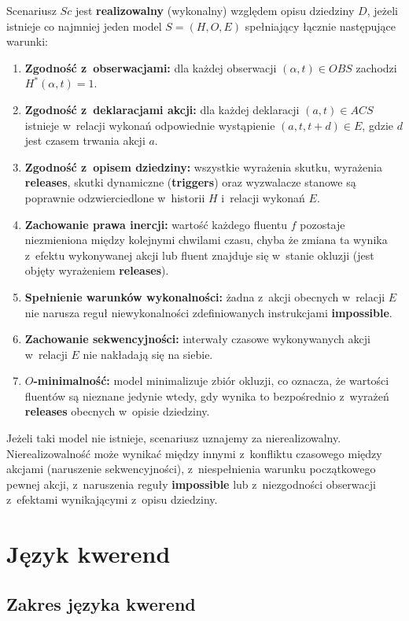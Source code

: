 \documentclass[12pt,a4paper]{article}
\begin{document}
Scenariusz $Sc$ jest \textbf{realizowalny} (wykonalny) względem opisu dziedziny $D$, jeżeli istnieje co najmniej jeden model $S = (H, O, E)$ spełniający łącznie następujące warunki:
\begin{enumerate}[label=\arabic*.]
    \item \textbf{Zgodność z~obserwacjami:} dla każdej obserwacji $(\alpha, t) \in OBS$ zachodzi $H^{*}(\alpha, t) = 1$.
    \item \textbf{Zgodność z~deklaracjami akcji:} dla każdej deklaracji $(a, t) \in ACS$ istnieje w~relacji wykonań odpowiednie wystąpienie $(a, t, t+d) \in E$, gdzie $d$ jest czasem trwania akcji $a$.
    \item \textbf{Zgodność z~opisem dziedziny:} wszystkie wyrażenia skutku, wyrażenia \textbf{releases}, skutki dynamiczne (\textbf{triggers}) oraz wyzwalacze stanowe są poprawnie odzwierciedlone w~historii $H$ i~relacji wykonań $E$.
    \item \textbf{Zachowanie prawa inercji:} wartość każdego fluentu $f$ pozostaje niezmieniona między kolejnymi chwilami czasu, chyba że zmiana ta wynika z~efektu wykonywanej akcji lub fluent znajduje się w~stanie okluzji (jest objęty wyrażeniem \textbf{releases}).
    \item \textbf{Spełnienie warunków wykonalności:} żadna z~akcji obecnych w~relacji $E$ nie narusza reguł niewykonalności zdefiniowanych instrukcjami \textbf{impossible}.
    \item \textbf{Zachowanie sekwencyjności:} interwały czasowe wykonywanych akcji w~relacji $E$ nie nakładają się na siebie.
    \item \textbf{$O$-minimalność:} model minimalizuje zbiór okluzji, co oznacza, że wartości fluentów są nieznane jedynie wtedy, gdy wynika to bezpośrednio z~wyrażeń \textbf{releases} obecnych w~opisie dziedziny.
\end{enumerate}
 
Jeżeli taki model nie istnieje, scenariusz uznajemy za nierealizowalny. Nierealizowalność może wynikać między innymi z~konfliktu czasowego między akcjami (naruszenie sekwencyjności), z~niespełnienia warunku początkowego pewnej akcji, z~naruszenia reguły \textbf{impossible} lub z~niezgodności obserwacji z~efektami wynikającymi z~opisu dziedziny.


\section{Język kwerend}

\subsection{Zakres języka kwerend}
\end{document}

